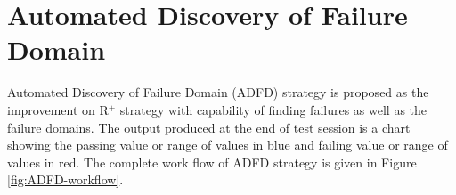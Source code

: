 

\section{Automated Discovery of Failure Domain}\label{sec:adfd}

Automated Discovery of Failure Domain (ADFD) strategy is proposed as the improvement on R$^+$ strategy with capability of finding failures as well as the failure domains. The output produced at the end of test session is a chart showing the passing value or range of values in blue and failing value or range of values in red. The complete work flow of ADFD strategy is given in Figure \ref{fig:ADFD-workflow}.

